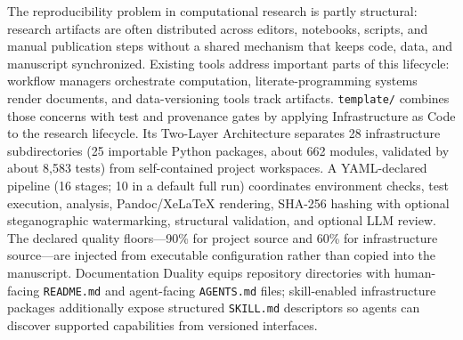 \documentclass[
  english,
]{article}
\begin{document}
The reproducibility problem in computational research is partly
structural: research artifacts are often distributed across editors,
notebooks, scripts, and manual publication steps without a shared
mechanism that keeps code, data, and manuscript synchronized. Existing
tools address important parts of this lifecycle: workflow managers
orchestrate computation, literate-programming systems render documents,
and data-versioning tools track artifacts. \texttt{template/} combines
those concerns with test and provenance gates by applying Infrastructure
as Code to the research lifecycle. Its Two-Layer Architecture separates
28 infrastructure subdirectories (25 importable Python packages,
about 662 modules, validated by about 8,583 tests)
from self-contained project workspaces. A YAML-declared pipeline (16
stages; 10 in a default full run) coordinates environment checks, test
execution, analysis, Pandoc/XeLaTeX rendering, SHA-256 hashing with
optional steganographic watermarking, structural validation, and
optional LLM review. The declared quality floors---90\% for project
source and 60\% for infrastructure source---are injected from executable
configuration rather than copied into the manuscript. Documentation
Duality equips repository directories with human-facing
\texttt{README.md} and agent-facing \texttt{AGENTS.md} files;
skill-enabled infrastructure packages additionally expose structured
\texttt{SKILL.md} descriptors so agents can discover supported
capabilities from versioned interfaces.
\end{document}
